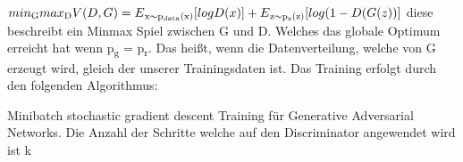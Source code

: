 \documentclass{llncs}
\begin{document}
\\\\
\begin{math}
min\textsubscript{G} max\textsubscript{D}V(D,G)=E\textsubscript{x$\sim$p\textsubscript{data}(x)}[logD(x)]  + E\textsubscript{z$\sim$p\textsubscript{z}(z)}[log(1-D(G(z))]
\\\\             
\end{math}
diese beschreibt ein Minmax Spiel zwischen G und D. Welches das globale Optimum erreicht hat wenn p\textsubscript{g} = p\textsubscript{r}. Das heißt, wenn die Datenverteilung, welche von G erzeugt wird, gleich der unserer Trainingsdaten ist\cite{goodfellow2014}. Das Training erfolgt durch den folgenden Algorithmus:
\\
\begin{algorithm}[H]
	\caption{Minibatch stochastic gradient descent Training für Generative Adversarial Networks. Die Anzahl der Schritte welche auf den Discriminator angewendet wird ist k }	
\end{algorithm}
\end{document}
